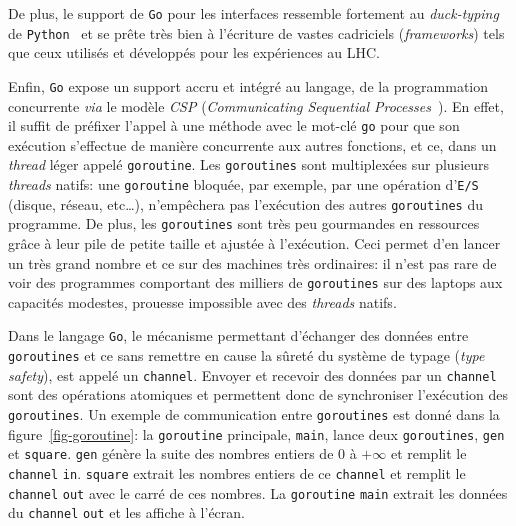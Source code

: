 \documentclass[a4paper,french]{article}
\begin{document}
De plus, le support de \texttt{Go} pour les interfaces ressemble fortement au
\emph{duck-typing} de \texttt{Python}~\cite{ref-python} et se pr\^ete tr\`es
bien \`a l'\'ecriture de vastes cadriciels (\emph{frameworks}) tels que ceux
utilis\'es et d\'evelopp\'es pour les exp\'eriences au LHC.

Enfin, \texttt{Go} expose un support accru et int\'egr\'e au langage, de la
programmation concurrente \emph{via} le mod\`ele \emph{CSP} (\emph{Communicating
Sequential Processes}~\cite{ref-csp}).
En effet, il suffit de pr\'efixer l'appel \`a une m\'ethode avec le mot-cl\'e
\texttt{go} pour que son ex\'ecution s'effectue de mani\`ere concurrente aux
autres fonctions, et ce, dans un \emph{thread} l\'eger appel\'e
\texttt{goroutine}.
Les \texttt{goroutines} sont multiplex\'ees sur plusieurs \emph{threads} natifs:
une \texttt{goroutine} bloqu\'ee, par exemple, par une op\'eration d'\texttt{E/S}
(disque, r\'eseau, etc\ldots), n'emp\^echera pas l'ex\'ecution des autres
\texttt{goroutines} du programme.
De plus, les \texttt{goroutines} sont tr\`es peu gourmandes en ressources
gr\^ace \`a leur pile de petite taille et ajust\'ee \`a l'ex\'ecution.
Ceci permet d'en lancer un tr\`es grand nombre et ce sur des machines tr\`es
ordinaires: il n'est pas rare de voir des programmes comportant des milliers de
\texttt{goroutines} sur des laptops aux capacit\'es modestes, prouesse
impossible avec des \emph{threads} natifs.

Dans le langage \texttt{Go}, le m\'ecanisme permettant d'\'echanger des
donn\'ees entre \texttt{goroutines} et ce sans remettre en cause la s\^uret\'e
du syst\`eme de typage (\emph{type safety}), est appel\'e un \texttt{channel}.
Envoyer et recevoir des donn\'ees par un \texttt{channel} sont des op\'erations
atomiques et permettent donc de synchroniser l'ex\'ecution des
\texttt{goroutines}.
Un exemple de communication entre \texttt{goroutines} est donn\'e dans la
figure~\ref{fig-goroutine}: la \texttt{goroutine} principale, \texttt{main},
lance deux \texttt{goroutines}, \texttt{gen} et \texttt{square}.
\texttt{gen} g\'en\`ere la suite des nombres entiers de $0$ \`a $+\infty$ et
remplit le \texttt{channel} \texttt{in}.
\texttt{square} extrait les nombres entiers de ce \texttt{channel} et remplit le
\texttt{channel} \texttt{out} avec le carr\'e de ces nombres.
La \texttt{goroutine} \texttt{main} extrait les donn\'ees du \texttt{channel}
\texttt{out} et les affiche \`a l'\'ecran.
\end{document}

